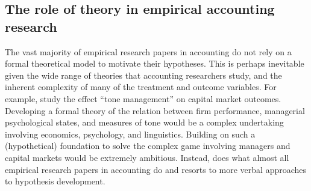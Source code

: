 \documentclass[11pt]{amsart}
\begin{document}
\subsection{The role of theory in empirical accounting research}
The vast majority of empirical research papers in accounting do not rely on a formal theoretical model to motivate their hypotheses.
This is perhaps inevitable given the wide range of theories that accounting researchers study, and the inherent complexity of many of the treatment and outcome variables.
For example, \citet{Huang:2014cs} study the effect ``tone management'' on capital market outcomes.
Developing a formal theory of the relation between firm performance, managerial psychological states, and measures of tone would be a complex undertaking involving economics, psychology, and linguistics.
Building on such a (hypothetical) foundation to solve the complex game involving managers and capital markets would be extremely ambitious.
Instead, \citet{Huang:2014cs} does what almost all empirical research papers in accounting do and resorts to more verbal approaches to hypothesis development. 


\clearpage


\clearpage



\clearpage

\end{document}

